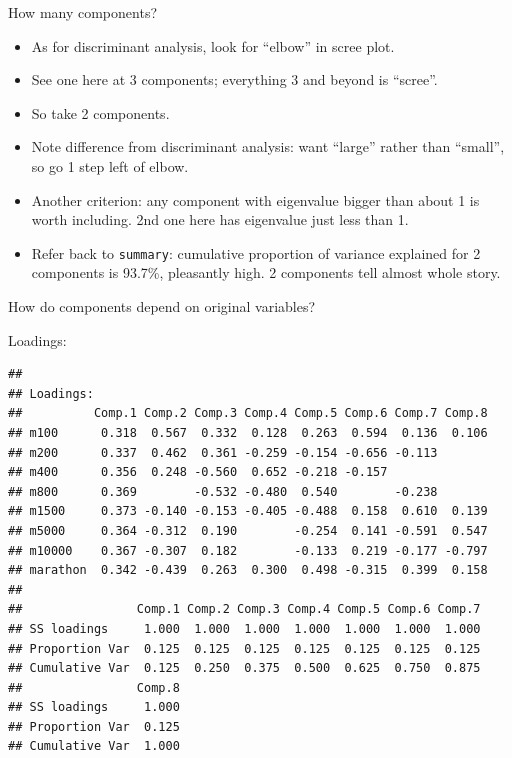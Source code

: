 \documentclass[ignorenonframetext,]{beamer}
\newenvironment{Shaded}{\begin{snugshade}}{\end{snugshade}}
\newcommand{\NormalTok}[1]{#1}
\newcommand{\OperatorTok}[1]{\textcolor[rgb]{0.81,0.36,0.00}{\textbf{#1}}}
\begin{document}
\begin{frame}[fragile]{How many components?}
\protect\hypertarget{how-many-components}{}

\begin{itemize}
\item
  As for discriminant analysis, look for ``elbow'' in scree plot.
\item
  See one here at 3 components; everything 3 and beyond is ``scree''.
\item
  So take 2 components.
\item
  Note difference from discriminant analysis: want ``large'' rather than
  ``small'', so go 1 step left of elbow.
\item
  Another criterion: any component with eigenvalue bigger than about 1
  is worth including. 2nd one here has eigenvalue just less than 1.
\item
  Refer back to \texttt{summary}: cumulative proportion of variance
  explained for 2 components is 93.7\%, pleasantly high. 2 components
  tell almost whole story.
\end{itemize}

\end{frame}

\begin{frame}[fragile]{How do components depend on original variables?}
\protect\hypertarget{how-do-components-depend-on-original-variables}{}

Loadings:

\footnotesize

\begin{Shaded}
\end{Shaded}

\begin{verbatim}
## 
## Loadings:
##          Comp.1 Comp.2 Comp.3 Comp.4 Comp.5 Comp.6 Comp.7 Comp.8
## m100      0.318  0.567  0.332  0.128  0.263  0.594  0.136  0.106
## m200      0.337  0.462  0.361 -0.259 -0.154 -0.656 -0.113       
## m400      0.356  0.248 -0.560  0.652 -0.218 -0.157              
## m800      0.369        -0.532 -0.480  0.540        -0.238       
## m1500     0.373 -0.140 -0.153 -0.405 -0.488  0.158  0.610  0.139
## m5000     0.364 -0.312  0.190        -0.254  0.141 -0.591  0.547
## m10000    0.367 -0.307  0.182        -0.133  0.219 -0.177 -0.797
## marathon  0.342 -0.439  0.263  0.300  0.498 -0.315  0.399  0.158
## 
##                Comp.1 Comp.2 Comp.3 Comp.4 Comp.5 Comp.6 Comp.7
## SS loadings     1.000  1.000  1.000  1.000  1.000  1.000  1.000
## Proportion Var  0.125  0.125  0.125  0.125  0.125  0.125  0.125
## Cumulative Var  0.125  0.250  0.375  0.500  0.625  0.750  0.875
##                Comp.8
## SS loadings     1.000
## Proportion Var  0.125
## Cumulative Var  1.000
\end{verbatim}

\normalsize

\end{frame}
\end{document}
